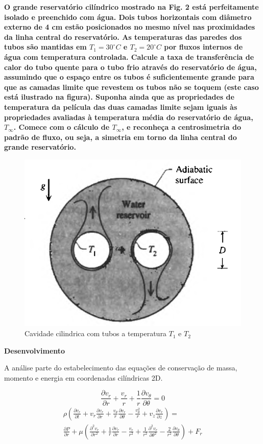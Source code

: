 \documentclass[12pt]{article}
\begin{document}
\textbf{O grande reservatório cilíndrico mostrado na Fig. 2 está perfeitamente isolado e preenchido com água. Dois tubos horizontais com diâmetro externo de 4 cm estão posicionados no mesmo nível nas proximidades da linha central do reservatório. As temperaturas das paredes dos tubos são mantidas em \( T_1 = 30^\circ C \) e \( T_2 = 20^\circ C \) por fluxos internos de água com temperatura controlada. Calcule a taxa de transferência de calor do tubo quente para o tubo frio através do reservatório de água, assumindo que o espaço entre os tubos é suficientemente grande para que as camadas limite que revestem os tubos não se toquem (este caso está ilustrado na figura). Suponha ainda que as propriedades de temperatura da película das duas camadas limite sejam iguais às propriedades avaliadas à temperatura média do reservatório de água, \( T_\infty \). Comece com o cálculo de \( T_\infty \), e reconheça a centrosimetria do padrão de fluxo, ou seja, a simetria em torno da linha central do grande reservatório.
}\\

\begin{figure}[H]
	\centering
	\includegraphics[width=.65\textwidth]{Figures/1_2}
	\caption{Cavidade cilindrica com tubos a temperatura $T_1$ e $T_2$ }
\end{figure}

\textbf{Desenvolvimento} 

A análise parte do estabelecimento das equações de conservação de massa, momento e energia em coordenadas cilíndricas 2D.

\begin{equation}
	\frac{\partial v_r}{\partial r} + \frac{v_r}{r} + \frac{1}{r} \frac{\partial v_\theta}{\partial \theta} = 0
\end{equation}
\begin{align}
	\rho \left( \frac{\partial v_r}{\partial t} + v_r \frac{\partial v_r}{\partial r} + \frac{v_\theta}{r} \frac{\partial v_r}{\partial \theta} - \frac{v_\theta^2}{r} + v_z \frac{\partial v_r}{\partial z} \right) = \\
	\frac{\partial P}{\partial r} + \mu \left( \frac{\partial^2 v_r}{\partial r^2} + \frac{1}{r} \frac{\partial v_r}{\partial r} - \frac{v_r}{r^2} + \frac{1}{r^{2}}\frac{\partial^2 v_r}{\partial \theta^2} - \frac{2}{r^{2}}  \frac{\partial v_\theta}{\partial \theta}  \right) + F_{r}
\end{align}
\end{document}
